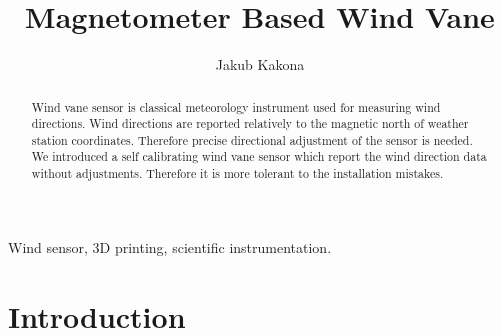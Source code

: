 \documentclass{poster16}
\begin{document}

%
\title{Magnetometer Based Wind Vane}
%

%
\author{Jakub Kakona }
%


\maketitle


\begin{abstract}
Wind vane sensor is classical meteorology instrument used for measuring wind directions. Wind directions are reported relatively to the magnetic north of weather station coordinates. Therefore precise directional adjustment of the sensor is needed. We introduced a self calibrating wind vane sensor which report the wind direction data without adjustments. Therefore it is more tolerant to the installation mistakes. 
\end{abstract}

\begin{keywords}
Wind sensor, 3D printing, scientific instrumentation.
\end{keywords}


\section{Introduction}
\end{document}
